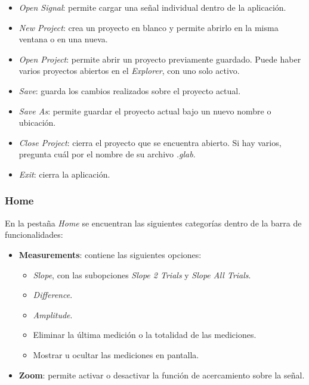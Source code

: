 \documentclass[12pt, letterpaper]{article}
\begin{document}
\begin{itemize}

    \item \textit{Open Signal}: permite cargar una señal individual dentro
    de la aplicación.

    \item \textit{New Project}: crea un proyecto en blanco y permite abrirlo
    en la misma ventana o en una nueva.

    \item \textit{Open Project}: permite abrir un proyecto previamente
    guardado. Puede haber varios proyectos abiertos en el \textit{Explorer},
    con uno solo activo.

    \item \textit{Save}: guarda los cambios realizados sobre el proyecto
    actual.

    \item \textit{Save As}: permite guardar el proyecto actual bajo un nuevo
    nombre o ubicación.

    \item \textit{Close Project}: cierra el proyecto que se encuentra abierto.
    Si hay varios, pregunta cuál por el nombre de su archivo \textit{.glab}.

    \item \textit{Exit}: cierra la aplicación.

\end{itemize}

\subsubsection{Home}

En la pestaña \textit{Home} se encuentran las siguientes categorías dentro
de la barra de funcionalidades:

\begin{itemize}

    \item \textbf{Measurements}: contiene las siguientes opciones:

    \begin{itemize}

        \item \textit{Slope}, con las subopciones \textit{Slope 2 Trials} y
        \textit{Slope All Trials}.

        \item \textit{Difference}.

        \item \textit{Amplitude}.

        \item Eliminar la última medición o la totalidad de las mediciones.

        \item Mostrar u ocultar las mediciones en pantalla.

    \end{itemize}

    \item \textbf{Zoom}: permite activar o desactivar la función de
    acercamiento sobre la señal.

\end{itemize}
\end{document}

